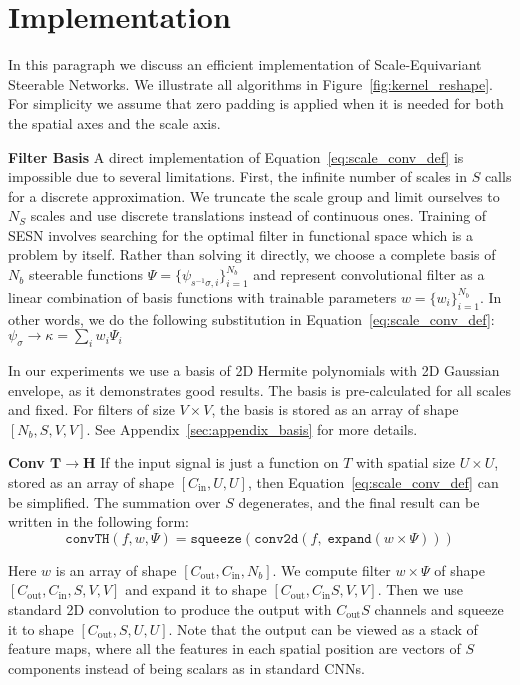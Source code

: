 \documentclass{article} \usepackage{multirow}
\def\Figref#1{Figure~\ref{#1}}
\def\Apref#1{Appendix~\ref{#1}}
\def\Eqref#1{Equation~\ref{#1}}
\begin{document}
 \section{Implementation}
In this paragraph we discuss an efficient implementation of Scale-Equivariant Steerable Networks.
We illustrate all algorithms in \Figref{fig:kernel_reshape}.
For simplicity we assume that zero padding is applied when it is needed for both the spatial axes and the scale axis. 

\label{sec:implementation}
\textbf{Filter Basis}
A direct implementation of \Eqref{eq:scale_conv_def} is impossible due to several limitations.
First, the infinite number of scales in $S$ calls for a discrete approximation.
We truncate the scale group and limit ourselves to $N_S$ scales
and use discrete translations instead of continuous ones.
Training of SESN involves searching for the optimal filter in functional space which is a problem by itself. 
Rather than solving it directly, 
we choose a complete basis of $N_b$ steerable functions $\Psi =\{\psi_{s^{-1}\sigma,i}\}_{i=1}^{N_b}$
and represent convolutional filter as a linear combination of
basis functions with trainable parameters $w=\{w_i\}_{i=1}^{N_b}$. In other words, we do the following 
substitution in \Eqref{eq:scale_conv_def}: 
$\psi_{\sigma} \rightarrow \kappa = \sum_i w_i \Psi_i$

In our experiments we use a basis of 2D Hermite polynomials with 2D Gaussian envelope, 
as it demonstrates good results. The basis is pre-calculated for all scales and 
fixed. For filters of size $V\times V$, the basis is stored as an array of shape $[N_b, S, V, V]$.
See \Apref{sec:appendix_basis} for more details.

\textbf{Conv $\bm{T\rightarrow H}$}
If the input signal is just a function on $T$ with spatial size $U\times U$, stored as an array of shape 
$[C_\text{in}, U, U]$,
then \Eqref{eq:scale_conv_def} can be simplified. The summation over $S$ degenerates, and the final result 
can be written in the following form:
\begin{equation}
    \label{eq:algoTH}
    \texttt{convTH}(f, w, \Psi) = \texttt{squeeze}(
        \texttt{conv2d}(f,\; 
        \texttt{expand}(w\times \Psi)
        )
    )
\end{equation}

Here $w$ is an array of shape $[C_\text{out}, C_\text{in}, N_b]$. We compute filter $w\times\Psi$
of shape $[C_\text{out}, C_\text{in}, S, V, V]$
and expand it to shape $[C_\text{out}, C_\text{in}S, V, V]$. Then we use standard 2D convolution
to produce the output with $C_\text{out}S$ channels and squeeze it to shape $[C_\text{out}, S, U, U]$.
Note that the output can be viewed as a stack of feature maps, where all the features in each spatial position 
are vectors of $S$ components
instead of being scalars as in standard CNNs. 
\end{document}
